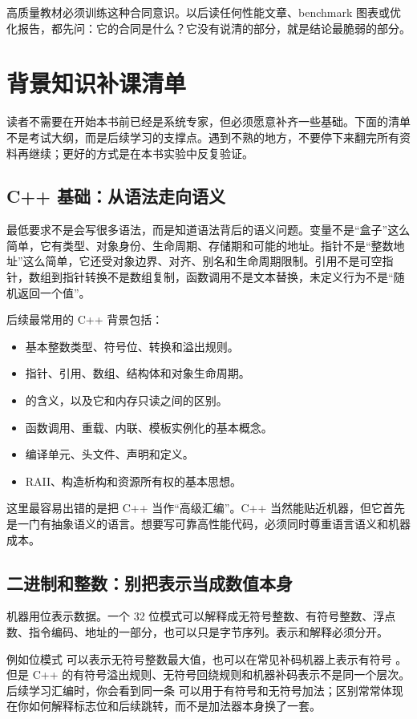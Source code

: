 高质量教材必须训练这种合同意识。以后读任何性能文章、benchmark 图表或优化报告，都先问：它的合同是什么？它没有说清的部分，就是结论最脆弱的部分。

\section{背景知识补课清单}

读者不需要在开始本书前已经是系统专家，但必须愿意补齐一些基础。下面的清单不是考试大纲，而是后续学习的支撑点。遇到不熟的地方，不要停下来翻完所有资料再继续；更好的方式是在本书实验中反复验证。

\subsection{C++ 基础：从语法走向语义}

最低要求不是会写很多语法，而是知道语法背后的语义问题。变量不是“盒子”这么简单，它有类型、对象身份、生命周期、存储期和可能的地址。指针不是“整数地址”这么简单，它还受对象边界、对齐、别名和生命周期限制。引用不是可空指针，数组到指针转换不是数组复制，函数调用不是文本替换，未定义行为不是“随机返回一个值”。

后续最常用的 C++ 背景包括：

\begin{itemize}
  \item 基本整数类型、符号位、转换和溢出规则。
  \item 指针、引用、数组、结构体和对象生命周期。
  \item {} 的含义，以及它和内存只读之间的区别。
  \item 函数调用、重载、内联、模板实例化的基本概念。
  \item 编译单元、头文件、声明和定义。
  \item RAII、构造析构和资源所有权的基本思想。
\end{itemize}

这里最容易出错的是把 C++ 当作“高级汇编”。C++ 当然能贴近机器，但它首先是一门有抽象语义的语言。想要写可靠高性能代码，必须同时尊重语言语义和机器成本。

\subsection{二进制和整数：别把表示当成数值本身}

机器用位表示数据。一个 32 位模式可以解释成无符号整数、有符号整数、浮点数、指令编码、地址的一部分，也可以只是字节序列。表示和解释必须分开。

例如位模式  可以表示无符号整数最大值，也可以在常见补码机器上表示有符号 。但是 C++ 的有符号溢出规则、无符号回绕规则和机器补码表示不是同一个层次。后续学习汇编时，你会看到同一条  可以用于有符号和无符号加法；区别常常体现在你如何解释标志位和后续跳转，而不是加法器本身换了一套。

